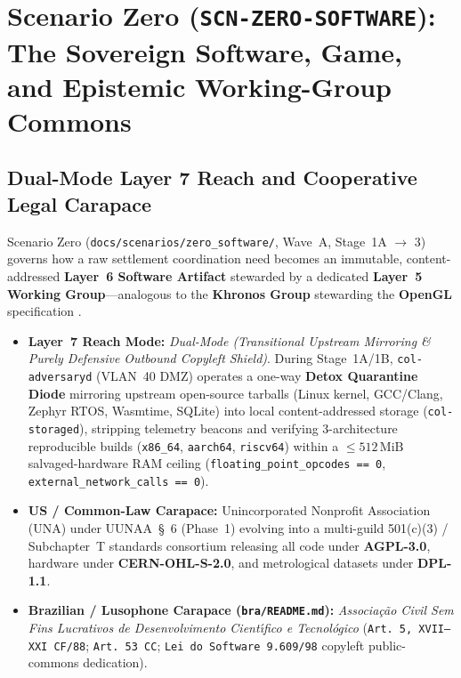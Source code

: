 \chapter{Scenario Zero (\texttt{SCN-ZERO-SOFTWARE}): The Sovereign Software, Game, and Epistemic Working-Group Commons}
\label{app:scenario-zero}

\section{Dual-Mode Layer 7 Reach and Cooperative Legal Carapace}
Scenario Zero (\texttt{docs/scenarios/zero\_software/}, Wave~A, Stage~1A $\to$ 3) governs how a raw settlement coordination need becomes an immutable, content-addressed \textbf{Layer~6 Software Artifact} stewarded by a dedicated \textbf{Layer~5 Working Group}---analogous to the \textbf{Khronos Group} stewarding the \textbf{OpenGL} specification \parencite{khronos_opengl}.
\begin{itemize}
    \item \textbf{Layer~7 Reach Mode:} \textit{Dual-Mode (Transitional Upstream Mirroring \& Purely Defensive Outbound Copyleft Shield)}. During Stage~1A/1B, \texttt{col-adversaryd} (VLAN~40 DMZ) operates a one-way \textbf{Detox Quarantine Diode} mirroring upstream open-source tarballs (Linux kernel, GCC/Clang, Zephyr RTOS, Wasmtime, SQLite) into local content-addressed storage (\texttt{col-storaged}), stripping telemetry beacons and verifying 3-architecture reproducible builds (\texttt{x86\_64}, \texttt{aarch64}, \texttt{riscv64}) within a $\le 512\,\mathrm{MiB}$ salvaged-hardware RAM ceiling (\texttt{floating\_point\_opcodes == 0}, \texttt{external\_network\_calls == 0}).
    \item \textbf{US / Common-Law Carapace:} Unincorporated Nonprofit Association (UNA) under UUNAA~\S~6 (Phase~1) evolving into a multi-guild 501(c)(3) / Subchapter~T standards consortium releasing all code under \textbf{AGPL-3.0}, hardware under \textbf{CERN-OHL-S-2.0}, and metrological datasets under \textbf{DPL-1.1}.
    \item \textbf{Brazilian / Lusophone Carapace (\texttt{bra/README.md}):} \textit{Associa{\c{c}}{\~a}o Civil Sem Fins Lucrativos de Desenvolvimento Cient{\'\i}fico e Tecnol{\'o}gico} (\texttt{Art.~5{\textordmasculine}, XVII--XXI CF/88}; \texttt{Art.~53 CC}; \texttt{Lei do Software 9.609/98} copyleft public-commons dedication).
\end{itemize}

